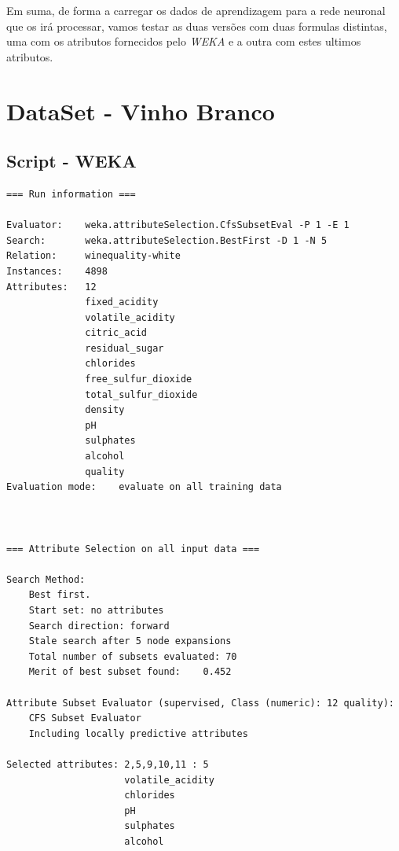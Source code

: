 \documentclass{report}
\begin{document}
Em suma, de forma a carregar os dados de aprendizagem para a rede neuronal que os irá processar, vamos testar as duas versões com duas formulas distintas, uma com os atributos fornecidos pelo \textit{WEKA} e a outra com estes ultimos atributos. 




















\section{DataSet - Vinho Branco}
\subsection{Script - WEKA}
\begin{verbatim}
=== Run information ===

Evaluator:    weka.attributeSelection.CfsSubsetEval -P 1 -E 1
Search:       weka.attributeSelection.BestFirst -D 1 -N 5
Relation:     winequality-white
Instances:    4898
Attributes:   12
              fixed_acidity
              volatile_acidity
              citric_acid
              residual_sugar
              chlorides
              free_sulfur_dioxide
              total_sulfur_dioxide
              density
              pH
              sulphates
              alcohol
              quality
Evaluation mode:    evaluate on all training data



=== Attribute Selection on all input data ===

Search Method:
	Best first.
	Start set: no attributes
	Search direction: forward
	Stale search after 5 node expansions
	Total number of subsets evaluated: 70
	Merit of best subset found:    0.452

Attribute Subset Evaluator (supervised, Class (numeric): 12 quality):
	CFS Subset Evaluator
	Including locally predictive attributes

Selected attributes: 2,5,9,10,11 : 5
                     volatile_acidity
                     chlorides
                     pH
                     sulphates
                     alcohol

\end{verbatim}
\end{document}
